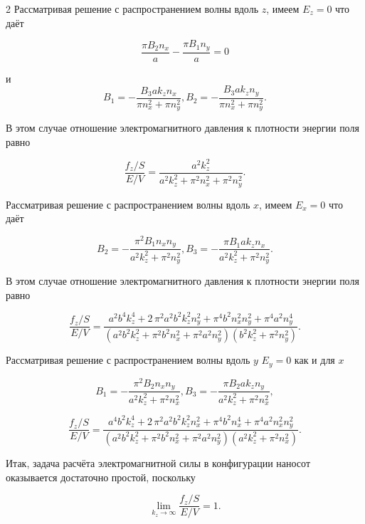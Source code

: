 \documentclass[twoside, 10pt]{article}
\begin{document}
\begin{multicols}{2}
Рассматривая решение с распространением волны вдоль \(z\), имеем
\(E_z = 0\) что даёт

\[\frac{\pi B_{2} n_{x}}{a} - \frac{\pi B_{1} n_{y}}{a} = 0\]

и
\[B_1 = -\frac{B_{3} a k_{z} n_{x}}{\pi n_{x}^{2} + \pi n_{y}^{2}},
B_2 = -\frac{B_{3} a k_{z} n_{y}}{\pi n_{x}^{2} + \pi n_{y}^{2}}.\]

В этом случае отношение электромагнитного давления к плотности энергии поля равно

\begin{equation}\frac{f_z/S}{E/V} = \frac{a^{2} k_{z}^{2}}{a^{2} k_{z}^{2} + \pi^{2} n_{x}^{2} + \pi^{2} n_{y}^{2}}.\end{equation}

    Рассматривая решение с распространением волны вдоль \(x\), имеем
\(E_x = 0\) что даёт

\[B_2 = -\frac{\pi^{2} B_{1} n_{x} n_{y}}{a^{2} k_{z}^{2} + \pi^{2} n_{y}^{2}},
B_3 = -\frac{\pi B_{1} a k_{z} n_{x}}{a^{2} k_{z}^{2} + \pi^{2} n_{y}^{2}}.\]

В этом случае отношение электромагнитного давления к плотности энергии поля равно

\[\frac{f_z/S}{E/V} = \frac{a^{2} b^{4} k_{z}^{4} + 2 \, \pi^{2} a^{2} b^{2} k_{z}^{2} n_{y}^{2} + \pi^{4} b^{2} n_{x}^{2} n_{y}^{2} + \pi^{4} a^{2} n_{y}^{4}}{{\left(a^{2} b^{2} k_{z}^{2} + \pi^{2} b^{2} n_{x}^{2} + \pi^{2} a^{2} n_{y}^{2}\right)} {\left(b^{2} k_{z}^{2} + \pi^{2} n_{y}^{2}\right)}}.\]

Рассматривая решение с распространением волны вдоль \(y\)
\(E_y = 0\) как и для \(x\)

    \[B_1 = -\frac{\pi^{2} B_{2} n_{x} n_{y}}{a^{2} k_{z}^{2} + \pi^{2} n_{x}^{2}},
      B_3 = -\frac{\pi B_{2} a k_{z} n_{y}}{a^{2} k_{z}^{2} + \pi^{2} n_{x}^{2}},\]

\[\frac{f_z/S}{E/V} = \frac{a^{4} b^{2} k_{z}^{4} + 2 \, \pi^{2} a^{2} b^{2} k_{z}^{2} n_{x}^{2} + \pi^{4} b^{2} n_{x}^{4} + \pi^{4} a^{2} n_{x}^{2} n_{y}^{2}}{{\left(a^{2} b^{2} k_{z}^{2} + \pi^{2} b^{2} n_{x}^{2} + \pi^{2} a^{2} n_{y}^{2}\right)} {\left(a^{2} k_{z}^{2} + \pi^{2} n_{x}^{2}\right)}}.\]

    Итак, задача расчёта электромагнитной силы в конфигурации наносот оказывается достаточно простой, поскольку

\begin{equation}\lim_{k_z \to \infty}\frac{f_z/S}{E/V} = 1.\end{equation}


\end{multicols}
\end{document}
